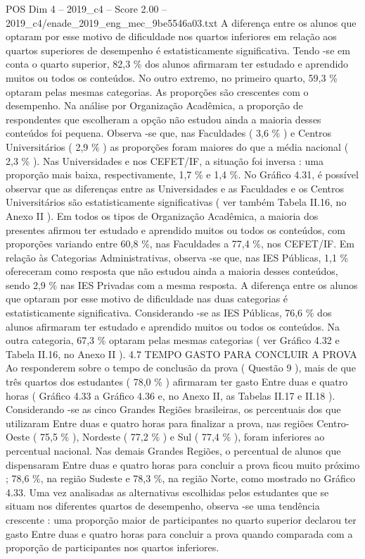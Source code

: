 \begin{textsample}{POS Dim 4 – 2019\_c4 – Score 2.00 – 2019\_c4/enade\_2019\_eng\_mec\_9be5546a03.txt}
A diferença entre os alunos que optaram por esse motivo de dificuldade nos quartos inferiores em relação aos quartos superiores de desempenho é estatisticamente significativa.
Tendo -se em conta o quarto superior, 82,3 \% dos alunos afirmaram ter estudado e aprendido muitos ou todos os conteúdos.
No outro extremo, no primeiro quarto, 59,3 \% optaram pelas mesmas categorias.
As proporções são crescentes com o desempenho.
Na análise por Organização Acadêmica, a proporção de respondentes que escolheram a opção não estudou ainda a maioria desses conteúdos foi pequena.
Observa -se que, nas Faculdades ( 3,6 \% ) e Centros Universitários ( 2,9 \% ) as proporções foram maiores do que a média nacional ( 2,3 \% ).
Nas Universidades e nos CEFET/IF, a situação foi inversa : uma proporção mais baixa, respectivamente, 1,7 \% e 1,4 \%.
No Gráfico 4.31, é possível observar que as diferenças entre as Universidades e as Faculdades e os Centros Universitários são estatisticamente significativas ( ver também Tabela II.16, no Anexo II ).
Em todos os tipos de Organização Acadêmica, a maioria dos presentes afirmou ter estudado e aprendido muitos ou todos os conteúdos, com proporções variando entre 60,8 \%, nas Faculdades a 77,4 \%, nos CEFET/IF.
Em relação às Categorias Administrativas, observa -se que, nas IES Públicas, 1,1 \% ofereceram como resposta que não estudou ainda a maioria desses conteúdos, sendo 2,9 \% nas IES Privadas com a mesma resposta.
A diferença entre os alunos que optaram por esse motivo de dificuldade nas duas categorias é estatisticamente significativa.
Considerando -se as IES Públicas, 76,6 \% dos alunos afirmaram ter estudado e aprendido muitos ou todos os conteúdos.
Na outra categoria, 67,3 \% optaram pelas mesmas categorias ( ver Gráfico 4.32 e Tabela II.16, no Anexo II ). 4.7 TEMPO GASTO PARA CONCLUIR A PROVA Ao responderem sobre o tempo de conclusão da prova ( Questão 9 ), mais de que três quartos dos estudantes ( 78,0 \% ) afirmaram ter gasto Entre duas e quatro horas ( Gráfico 4.33 a Gráfico 4.36 e, no Anexo II, as Tabelas II.17 e II.18 ).
Considerando -se as cinco Grandes Regiões brasileiras, os percentuais dos que utilizaram Entre duas e quatro horas para finalizar a prova, nas regiões Centro-Oeste ( 75,5 \% ), Nordeste ( 77,2 \% ) e Sul ( 77,4 \% ), foram inferiores ao percentual nacional.
Nas demais Grandes Regiões, o percentual de alunos que dispensaram Entre duas e quatro horas para concluir a prova ficou muito próximo ; 78,6 \%, na região Sudeste e 78,3 \%, na região Norte, como mostrado no Gráfico 4.33.
Uma vez analisadas as alternativas escolhidas pelos estudantes que se situam nos diferentes quartos de desempenho, observa -se uma tendência crescente : uma proporção maior de participantes no quarto superior declarou ter gasto Entre duas e quatro horas para concluir a prova quando comparada com a proporção de participantes nos quartos inferiores.

\end{textsample}
